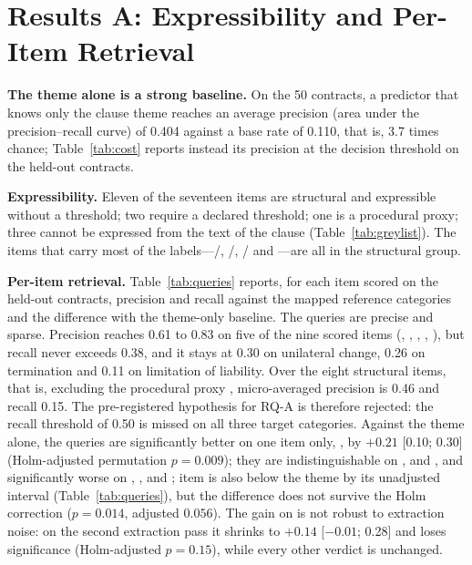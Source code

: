 \section{Results A: Expressibility and Per-Item Retrieval}
\label{sec:results}
\textbf{The theme alone is a strong baseline.} On the 50 contracts, a predictor that knows only the clause theme reaches an average precision (area under the precision--recall curve) of 0.404 against a base rate of 0.110, that is, 3.7 times chance; Table~\ref{tab:cost} reports instead its precision at the decision threshold on the held-out contracts.

\textbf{Expressibility.} Eleven of the seventeen items are structural and expressible without a threshold; two require a declared threshold; one is a procedural proxy; three cannot be expressed from the text of the clause (Table~\ref{tab:greylist}). The items that carry most of the \corpus{} labels---/, /, / and ---are all in the structural group.

\textbf{Per-item retrieval.} Table~\ref{tab:queries} reports, for each item scored on the held-out contracts, precision and recall against the mapped reference categories and the difference with the theme-only baseline. The queries are precise and sparse. Precision reaches 0.61 to 0.83 on five of the nine scored items (, , , , ), but recall never exceeds 0.38, and it stays at 0.30 on unilateral change, 0.26 on termination and 0.11 on limitation of liability. Over the eight structural items, that is, excluding the procedural proxy , micro-averaged precision is 0.46 and recall 0.15. The pre-registered hypothesis for RQ-A is therefore rejected: the recall threshold of 0.50 is missed on all three target categories. Against the theme alone, the queries are significantly better on one item only, , by $+0.21$ [0.10; 0.30] (Holm-adjusted permutation $p = 0.009$); they are indistinguishable on ,  and , and significantly worse on , ,  and ; item  is also below the theme by its unadjusted interval (Table~\ref{tab:queries}), but the difference does not survive the Holm correction ($p = 0.014$, adjusted $0.056$). The gain on  is not robust to extraction noise: on the second extraction pass it shrinks to $+0.14$ [$-0.01$; 0.28] and loses significance (Holm-adjusted $p = 0.15$), while every other verdict is unchanged.



